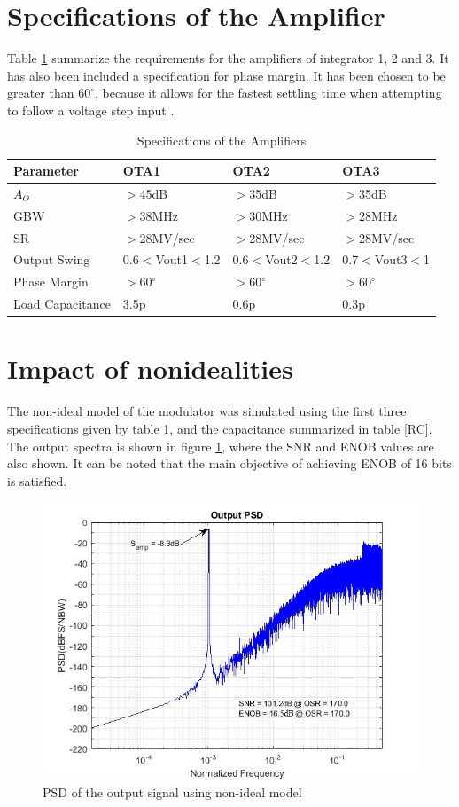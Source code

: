 \section{Specifications of the Amplifier}
Table \ref{spec_ota} summarize the requirements for the amplifiers of integrator 1, 2 and 3. It has also been included a specification for phase margin. It has been chosen to be greater than $60^\circ$, because it allows for the fastest settling time when attempting to follow a voltage step input \cite{phase}. 

\begin{table}[H]
\centering
\caption{Specifications of the Amplifiers}
\label{spec_ota}
\begin{tabular}{|l|l|l|l|}
\hline
Parameter        & OTA1     & OTA2     & OTA3     \\ \hline
$A_O$             & $>$45dB     & $>$35dB     & $>$35dB     \\ \hline
GBW              & $>$38MHz    & $>$30MHz    & $>$28MHz    \\ \hline
SR               & $>$28MV/sec & $>$28MV/sec & $>$28MV/sec \\ \hline
Output Swing     & 0.6$<$Vout1$<$1.2 & 0.6$<$Vout2$<$1.2  & 0.7$<$Vout3$<$1         \\ \hline
Phase Margin     & $>$60$^\circ$       & $>$60$^\circ$       & $>$60$^\circ$       \\ \hline
Load Capacitance & 3.5p     & 0.6p     & 0.3p     \\ \hline
\end{tabular}
\end{table}

\section{Impact of nonidealities}

The non-ideal model of the modulator was simulated using the first three specifications given by table \ref{spec_ota}, and the capacitance summarized in table \ref{RC}. The output spectra is shown in figure \ref{fig:psd_non_ideal}, where the SNR and ENOB values are also shown. It can be noted that the main objective of achieving ENOB of 16 bits is satisfied.   

\begin{figure}[ht]
\centering
\includegraphics[scale=0.55]{images/psd_out_spec.jpg}
\caption{PSD of the output signal using non-ideal model}
\label{fig:psd_non_ideal}
\end{figure}
